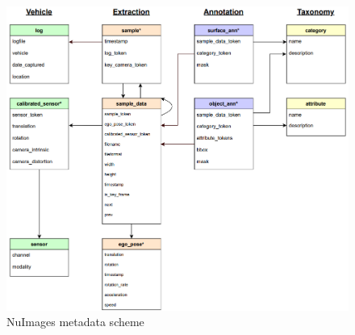 \begin{figure}[!ht]
    \centering
    \includegraphics[width=0.6\linewidth]{images/appendix/NuImages_scheme.png}
    \caption{NuImages metadata scheme}
    \label{fig:nuimages_scheme}
\end{figure}
